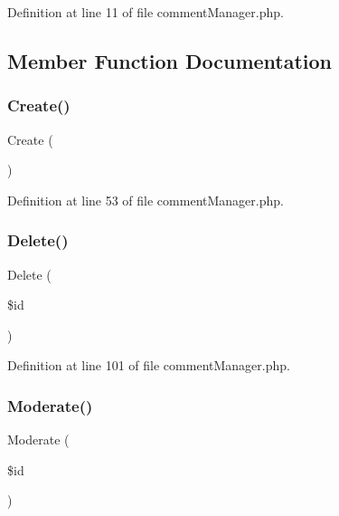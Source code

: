 Definition at line 11 of file comment\+Manager.\+php.



\subsection{Member Function Documentation}
\mbox{\label{class_src_1_1_managers_1_1comment_manager_ad01f71fa0ecc039494e3c282864298c3}} 
\subsubsection{Create()}
{\footnotesize\ttfamily Create (\begin{DoxyParamCaption}{ }\end{DoxyParamCaption})}



Definition at line 53 of file comment\+Manager.\+php.

\mbox{\label{class_src_1_1_managers_1_1comment_manager_a59113b5ecd1d155db6a4f30af34a1e80}} 
\subsubsection{Delete()}
{\footnotesize\ttfamily Delete (\begin{DoxyParamCaption}\item[{}]{\$id }\end{DoxyParamCaption})}



Definition at line 101 of file comment\+Manager.\+php.

\mbox{\label{class_src_1_1_managers_1_1comment_manager_a511df177d885f133ac59c2b68c7046f2}} 
\subsubsection{Moderate()}
{\footnotesize\ttfamily Moderate (\begin{DoxyParamCaption}\item[{}]{\$id }\end{DoxyParamCaption})}



